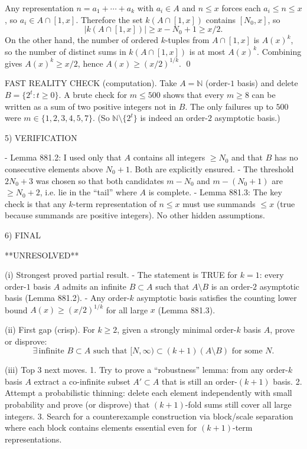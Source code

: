 Any representation $n=a_1+\cdots+a_k$ with $a_i\in A$ and $n\le x$ forces each $a_i\le n\le x$, so $a_i\in A\cap[1,x]$.
Therefore the set $k(A\cap[1,x])$ contains $[N_0,x]$, so
\[|k(A\cap[1,x])|\ge x-N_0+1\ge x/2.\]
On the other hand, the number of ordered $k$-tuples from $A\cap[1,x]$ is $A(x)^k$, so the number of distinct sums in $k(A\cap[1,x])$ is at most $A(x)^k$.
Combining gives $A(x)^k\ge x/2$, hence $A(x)\ge (x/2)^{1/k}$. \qed

FAST REALITY CHECK (computation).
Take $A=\mathbb N$ (order-$1$ basis) and delete $B=\{2^t:t\ge 0\}$.
A brute check for $m\le 500$ shows that every $m\ge 8$ can be written as a sum of two positive integers not in $B$.
The only failures up to $500$ were $m\in\{1,2,3,4,5,7\}$.
(So $\mathbb N\setminus\{2^t\}$ is indeed an order-$2$ asymptotic basis.)

5) VERIFICATION

- Lemma 881.2: I used only that $A$ contains all integers $\ge N_0$ and that $B$ has no consecutive elements above $N_0+1$. Both are explicitly ensured.
- The threshold $2N_0+3$ was chosen so that both candidates $m-N_0$ and $m-(N_0+1)$ are $\ge N_0+2$, i.e. lie in the “tail” where $A$ is complete.
- Lemma 881.3: The key check is that any $k$-term representation of $n\le x$ must use summands $\le x$ (true because summands are positive integers). No other hidden assumptions.

6) FINAL

**UNRESOLVED**

(i) Strongest proved partial result.
- The statement is TRUE for $k=1$: every order-$1$ basis $A$ admits an infinite $B\subset A$ such that $A\setminus B$ is an order-$2$ asymptotic basis (Lemma 881.2).
- Any order-$k$ asymptotic basis satisfies the counting lower bound $A(x)\ge (x/2)^{1/k}$ for all large $x$ (Lemma 881.3).

(ii) First gap (crisp).
For $k\ge 2$, given a strongly minimal order-$k$ basis $A$, prove or disprove:
\[\exists\,\text{infinite }B\subset A\text{ such that }[N,\infty)\subset (k+1)(A\setminus B)\text{ for some }N.\]

(iii) Top 3 next moves.
1. Try to prove a “robustness” lemma: from any order-$k$ basis $A$ extract a co-infinite subset $A'\subset A$ that is still an order-$(k+1)$ basis.
2. Attempt a probabilistic thinning: delete each element independently with small probability and prove (or disprove) that $(k+1)$-fold sums still cover all large integers.
3. Search for a counterexample construction via block/scale separation where each block contains elements essential even for $(k+1)$-term representations.

